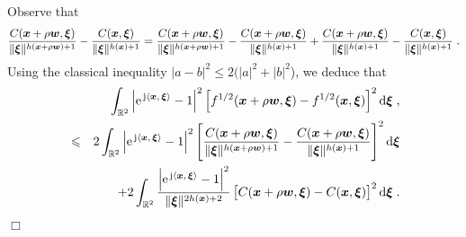 \documentclass{elsarticle}
\newenvironment{proof}{\medskip\noindent{\bf Proof.}\;}{\null\hfill $\Box$\par\medskip }
\begin{document}
\begin{proof}
Observe that
\begin{equation*}
\frac{C(\bm{x}+\rho \bm{w},\bm{\xi})}{\lVert \bm{\xi} \rVert^{h(\bm{x}+\rho \bm{w})+1}}-\frac{C(\bm{x},\bm{\xi})}{\lVert \bm{\xi} \rVert^{h(\bm{x})+1}}=\frac{C(\bm{x}+\rho \bm{w},\bm{\xi})}{\lVert \bm{\xi} \rVert^{h(\bm{x}+\rho \bm{w})+1}}-\frac{C(\bm{x}+\rho \bm{w},\bm{\xi})}{\lVert \bm{\xi} \rVert^{h(\bm{x})+1}}+\frac{C(\bm{x}+\rho \bm{w},\bm{\xi})}{\lVert \bm{\xi} \rVert^{h(\bm{x})+1}}-\frac{C(\bm{x},\bm{\xi})}{\lVert \bm{\xi} \rVert^{h(\bm{x})+1}}\;.
\end{equation*}
Using the classical inequality $|a-b|^2\leq 2(|a|^2+|b|^2$), we deduce that
\begin{eqnarray*}
&&\int_{\mathbb{R}^2}\left|\expj{\ip{\vect{x}}{\vect{\xi}}}-1\right|^2\left[f^{1/2}(\vect{x}+\rho \vect{w},\vect{\xi})-f^{1/2}(\vect{x},\vect{\xi})\right]^2\dif \vect{\xi}\;,\\
&\leq& 2\int_{\mathbb{R}^2}\left|\expj{\ip{\vect{x}}{\vect{\xi}}}-1\right|^2\left[\frac{C(\vect{x}+\rho \vect{w},\vect{\xi})}{\lVert \vect{\xi} \rVert^{h(\vect{x}+\rho \vect{w})+1}}-\frac{C(\vect{x}+\rho \vect{w},\vect{\xi})}{\lVert \vect{\xi} \rVert^{h(\vect{x})+1}}\right]^2\dif\vect{\xi}\\
&&+2\int_{\mathbb{R}^2}\frac{\left|\expj{\ip{\vect{x}}{\vect{\xi}}}-1\right|^2}{\lVert \vect{\xi} \rVert^{2h(\vect{x})+2}}\left[C(\vect{x}+\rho \vect{w},\vect{\xi})-C(\vect{x},\vect{\xi})\right]^2\dif\vect{\xi}\;.
\end{eqnarray*}



\end{proof}
\end{document}
